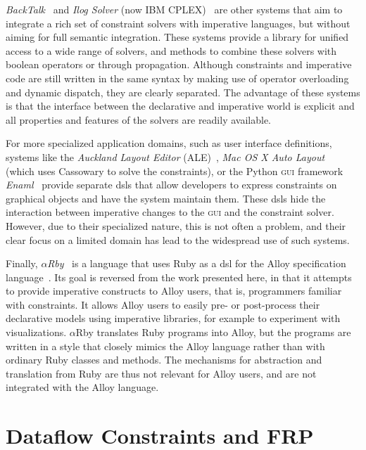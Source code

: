 \emph{BackTalk}~\cite{roy1997reifying} and \emph{Ilog Solver} (now IBM
CPLEX)~\cite{ilogmanual,puget1994c++} are other systems that aim to integrate a
rich set of constraint solvers with imperative languages, but without aiming for
full semantic integration. These systems provide a library for unified access to
a wide range of solvers, and methods to combine these solvers with boolean
operators or through propagation. Although constraints and imperative code are
still written in the same syntax by making use of operator overloading and
dynamic dispatch, they are clearly separated. The advantage of these systems is
that the interface between the declarative and imperative world is explicit and
all properties and features of the solvers are readily available.

For more specialized application domains, such as user interface definitions,
systems like the \emph{Auckland Layout Editor} (ALE)~\cite{lutteroth2008end},
\emph{Mac OS X Auto Layout}~\cite{AppleCocoaAutoLayout} (which uses Cassowary to
solve the constraints), or the Python \textsc{gui} framework
\emph{Enaml}~\cite{Enaml} provide separate \acp{dsl} that allow developers to
express constraints on graphical objects and have the system maintain
them. These \acp{dsl} hide the interaction between imperative changes to the
\textsc{gui} and the constraint solver. However, due to their specialized
nature, this is not often a problem, and their clear focus on a limited domain
has lead to the widespread use of such systems.

Finally, \emph{$\alpha$Rby}~\cite{alloyRuby2014} is a language that uses Ruby as
a \ac{dsl} for the Alloy specification
language~\cite{DBLP:journals/tosem/Jackson02}. Its goal is reversed from the
work presented here, in that it attempts to provide imperative constructs to
Alloy users, that is, programmers familiar with constraints. It allows Alloy
users to easily pre- or post-process their declarative models using imperative
libraries, for example to experiment with visualizations. $\alpha$Rby translates
Ruby programs into Alloy, but the programs are written in a style that closely
mimics the Alloy language rather than with ordinary Ruby classes and
methods. The mechanisms for abstraction and translation from Ruby are thus not
relevant for Alloy users, and are not integrated with the Alloy language.

\section{Dataflow Constraints and FRP}

